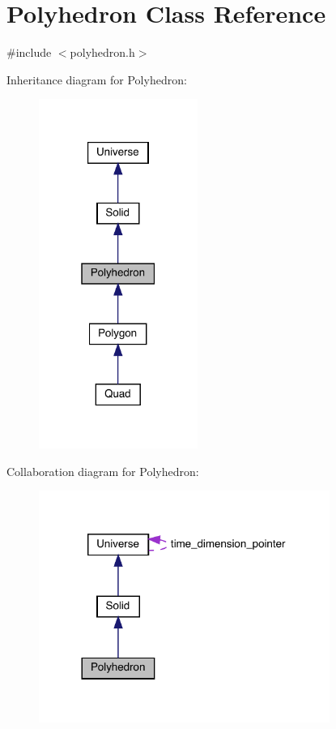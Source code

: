 \hypertarget{class_polyhedron}{}\section{Polyhedron Class Reference}
\label{class_polyhedron}


{\ttfamily \#include $<$polyhedron.\+h$>$}



Inheritance diagram for Polyhedron\+:\nopagebreak
\begin{figure}[H]
\begin{center}
\leavevmode
\includegraphics[width=147pt]{class_polyhedron__inherit__graph}
\end{center}
\end{figure}


Collaboration diagram for Polyhedron\+:
\nopagebreak
\begin{figure}[H]
\begin{center}
\leavevmode
\includegraphics[width=269pt]{class_polyhedron__coll__graph}
\end{center}
\end{figure}
